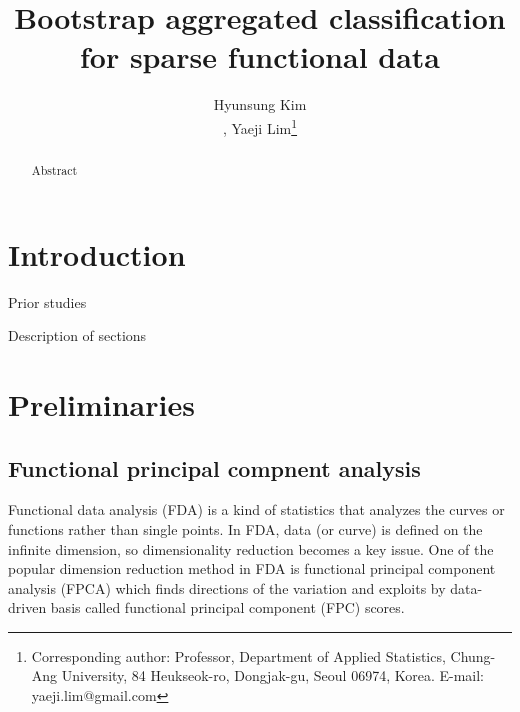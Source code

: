 \documentclass[eng]{csam}
\begin{document}
\title{Bootstrap aggregated classification for sparse functional data}

\author{Hyunsung Kim\address[a]{Department of Statistics, Chung-Ang University, Korea}, 
	Yaeji Lim\footnote{Corresponding author: Professor, Department of Applied Statistics, Chung-Ang University, 84 Heukseok-ro, Dongjak-gu, Seoul 06974, Korea. E-mail: yaeji.lim@gmail.com}\address[b]{Department of Applied Statistics, Chung-Ang University, Korea}}

\begin{abstract}
	{\color{red}
		Abstract
	}
\end{abstract}


\section{Introduction}
{\color{red} 
	Prior studies
	
	Description of sections
}


\section{Preliminaries}
\subsection{Functional principal compnent analysis}
Functional data analysis (FDA) is a kind of statistics that analyzes the curves or functions rather than single points.
In FDA, data (or curve) is defined on the infinite dimension, so dimensionality reduction becomes a key issue. One of the popular dimension reduction method in FDA is functional principal component analysis (FPCA) which finds directions of the variation and exploits by data-driven basis called functional principal component (FPC) scores. 
\end{document}
